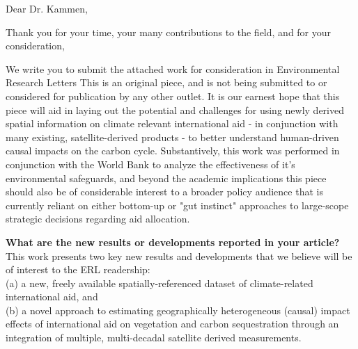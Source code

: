 \documentclass[11pt,a4paper,roman]{moderncv}        %
\begin{document}
\date{\today}
\opening{Dear Dr. Kammen,}
\closing{Thank you for your time, your many contributions to the field, and for your consideration,}
\makelettertitle

We write you to submit the attached work for consideration in Environmental Research Letters  This is an original piece, and is not being submitted to or considered for publication by any other outlet.  It is our earnest hope that this piece will aid in laying out the potential and challenges for using newly derived spatial information on climate relevant international aid - in conjunction with many existing, satellite-derived products - to better understand human-driven causal impacts on the carbon cycle.  Substantively, this work was performed in conjunction with the World Bank to analyze the effectiveness of it's environmental safeguards, and beyond the academic implications this piece should also be of considerable interest to a broader policy audience that is currently reliant on either bottom-up or "gut instinct" approaches to large-scope strategic decisions regarding aid allocation.\\
\vspace{4 mm}

\textbf{What are the new results or developments reported in your article?}\\
This work presents two key new results and developments that we believe will be of interest to the ERL readership:\\
(a) a new, freely available spatially-referenced dataset of climate-related international aid, and\\
(b) a novel approach to estimating geographically heterogeneous (causal) impact effects of international aid on vegetation and carbon sequestration through an integration of multiple, multi-decadal satellite derived measurements. \\
\vspace{4 mm}
\end{document}
